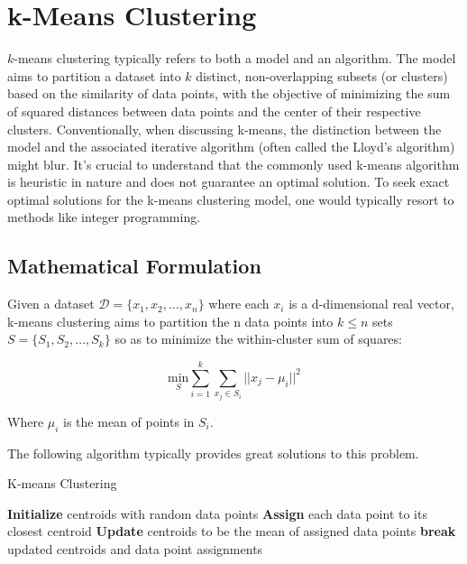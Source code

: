 \section{k-Means Clustering}

$k$-means clustering typically refers to both a model and an algorithm. The model aims to partition a dataset into \(k\) distinct, non-overlapping subsets (or clusters) based on the similarity of data points, with the objective of minimizing the sum of squared distances between data points and the center of their respective clusters. Conventionally, when discussing k-means, the distinction between the model and the associated iterative algorithm (often called the Lloyd's algorithm) might blur. It's crucial to understand that the commonly used k-means algorithm is heuristic in nature and does not guarantee an optimal solution. To seek exact optimal solutions for the k-means clustering model, one would typically resort to methods like integer programming.






\subsection{Mathematical Formulation}

Given a dataset \(\mathcal{D} = \{x_1, x_2, \dots, x_n\}\) where each \(x_i\) is a d-dimensional real vector, k-means clustering aims to partition the n data points into \(k \leq n\) sets \(S = \{S_1, S_2, \dots, S_k\}\) so as to minimize the within-cluster sum of squares:

\[
\underset{S}{\text{min}} \sum_{i=1}^{k} \sum_{x_j \in S_i} ||x_j - \mu_i||^2
\]

Where \(\mu_i\) is the mean of points in \(S_i\).


The following algorithm typically provides great solutions to this problem.
\begin{algorithm}
\caption{K-means Clustering}
\begin{algorithmic}[1]
    \State \textbf{Initialize} centroids with random data points
        \State \textbf{Assign} each data point to its closest centroid
        \State \textbf{Update} centroids to be the mean of assigned data points
            \State \textbf{break}
        \EndIf
    \EndFor
    \State \Return updated centroids and data point assignments
\EndProcedure
\end{algorithmic}
\end{algorithm}



